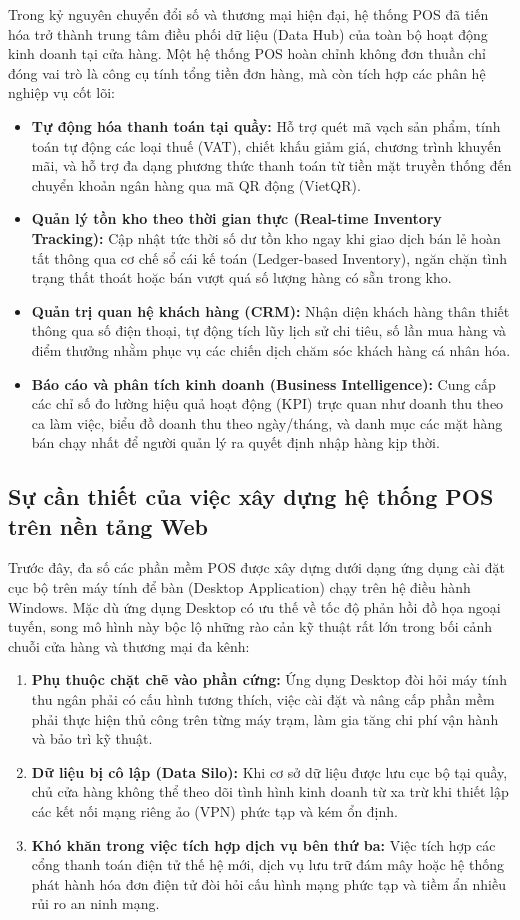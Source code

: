 Trong kỷ nguyên chuyển đổi số và thương mại hiện đại, hệ thống POS đã tiến hóa trở thành trung tâm điều phối dữ liệu (Data Hub) của toàn bộ hoạt động kinh doanh tại cửa hàng. Một hệ thống POS hoàn chỉnh không đơn thuần chỉ đóng vai trò là công cụ tính tổng tiền đơn hàng, mà còn tích hợp các phân hệ nghiệp vụ cốt lõi:
\begin{itemize}[leftmargin=1.5cm]
    \item \textbf{Tự động hóa thanh toán tại quầy:} Hỗ trợ quét mã vạch sản phẩm, tính toán tự động các loại thuế (VAT), chiết khấu giảm giá, chương trình khuyến mãi, và hỗ trợ đa dạng phương thức thanh toán từ tiền mặt truyền thống đến chuyển khoản ngân hàng qua mã QR động (VietQR).
    \item \textbf{Quản lý tồn kho theo thời gian thực (Real-time Inventory Tracking):} Cập nhật tức thời số dư tồn kho ngay khi giao dịch bán lẻ hoàn tất thông qua cơ chế sổ cái kế toán (Ledger-based Inventory), ngăn chặn tình trạng thất thoát hoặc bán vượt quá số lượng hàng có sẵn trong kho.
    \item \textbf{Quản trị quan hệ khách hàng (CRM):} Nhận diện khách hàng thân thiết thông qua số điện thoại, tự động tích lũy lịch sử chi tiêu, số lần mua hàng và điểm thưởng nhằm phục vụ các chiến dịch chăm sóc khách hàng cá nhân hóa.
    \item \textbf{Báo cáo và phân tích kinh doanh (Business Intelligence):} Cung cấp các chỉ số đo lường hiệu quả hoạt động (KPI) trực quan như doanh thu theo ca làm việc, biểu đồ doanh thu theo ngày/tháng, và danh mục các mặt hàng bán chạy nhất để người quản lý ra quyết định nhập hàng kịp thời.
\end{itemize}

\subsection{Sự cần thiết của việc xây dựng hệ thống POS trên nền tảng Web}
Trước đây, đa số các phần mềm POS được xây dựng dưới dạng ứng dụng cài đặt cục bộ trên máy tính để bàn (Desktop Application) chạy trên hệ điều hành Windows. Mặc dù ứng dụng Desktop có ưu thế về tốc độ phản hồi đồ họa ngoại tuyến, song mô hình này bộc lộ những rào cản kỹ thuật rất lớn trong bối cảnh chuỗi cửa hàng và thương mại đa kênh:
\begin{enumerate}[label=\arabic*., leftmargin=1.5cm]
    \item \textbf{Phụ thuộc chặt chẽ vào phần cứng:} Ứng dụng Desktop đòi hỏi máy tính thu ngân phải có cấu hình tương thích, việc cài đặt và nâng cấp phần mềm phải thực hiện thủ công trên từng máy trạm, làm gia tăng chi phí vận hành và bảo trì kỹ thuật.
    \item \textbf{Dữ liệu bị cô lập (Data Silo):} Khi cơ sở dữ liệu được lưu cục bộ tại quầy, chủ cửa hàng không thể theo dõi tình hình kinh doanh từ xa trừ khi thiết lập các kết nối mạng riêng ảo (VPN) phức tạp và kém ổn định.
    \item \textbf{Khó khăn trong việc tích hợp dịch vụ bên thứ ba:} Việc tích hợp các cổng thanh toán điện tử thế hệ mới, dịch vụ lưu trữ đám mây hoặc hệ thống phát hành hóa đơn điện tử đòi hỏi cấu hình mạng phức tạp và tiềm ẩn nhiều rủi ro an ninh mạng.
\end{enumerate}

